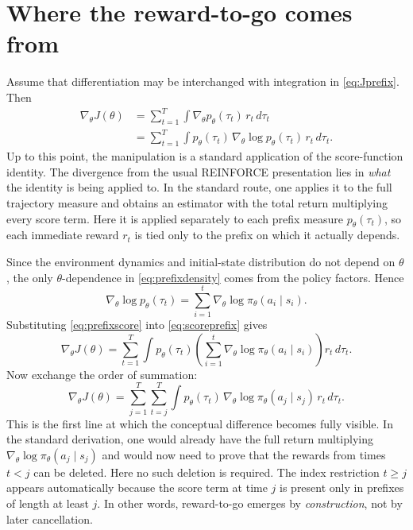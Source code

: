 \documentclass[11pt]{article}
\begin{document}
\section{Where the reward-to-go comes from}
Assume that differentiation may be interchanged with integration in \eqref{eq:Jprefix}. Then
\begin{align}
\nabla_\theta J(\theta)
&=\sum_{t=1}^T \int \nabla_\theta p_\theta(\tau_t)\,r_t\,d\tau_t \\
&=\sum_{t=1}^T \int p_\theta(\tau_t)\,\nabla_\theta \log p_\theta(\tau_t)\,r_t\,d\tau_t.
\label{eq:scoreprefix}
\end{align}
Up to this point, the manipulation is a standard application of the score-function identity. The divergence from the usual REINFORCE presentation lies in \emph{what} the identity is being applied to. In the standard route, one applies it to the full trajectory measure and obtains an estimator with the total return multiplying every score term. Here it is applied separately to each prefix measure $p_\theta(\tau_t)$, so each immediate reward $r_t$ is tied only to the prefix on which it actually depends.

Since the environment dynamics and initial-state distribution do not depend on $\theta$, the only $\theta$-dependence in \eqref{eq:prefixdensity} comes from the policy factors. Hence
\begin{equation}
\nabla_\theta \log p_\theta(\tau_t)=\sum_{i=1}^t \nabla_\theta \log \pi_\theta(a_i\mid s_i).
\label{eq:prefixscore}
\end{equation}
Substituting \eqref{eq:prefixscore} into \eqref{eq:scoreprefix} gives
\[
\nabla_\theta J(\theta)
=\sum_{t=1}^T \int p_\theta(\tau_t)\left(\sum_{i=1}^t \nabla_\theta \log \pi_\theta(a_i\mid s_i)\right)r_t\,d\tau_t.
\]
Now exchange the order of summation:
\begin{equation}
\nabla_\theta J(\theta)
=\sum_{j=1}^T\sum_{t=j}^T \int p_\theta(\tau_t)\,\nabla_\theta\log\pi_\theta(a_j\mid s_j)\,r_t\,d\tau_t.
\label{eq:swappedsums}
\end{equation}
This is the first line at which the conceptual difference becomes fully visible. In the standard derivation, one would already have the full return multiplying $\nabla_\theta \log \pi_\theta(a_j\mid s_j)$ and would now need to prove that the rewards from times $t<j$ can be deleted. Here no such deletion is required. The index restriction $t\geq j$ appears automatically because the score term at time $j$ is present only in prefixes of length at least $j$. In other words, reward-to-go emerges by \emph{construction}, not by later cancellation.
\end{document}
